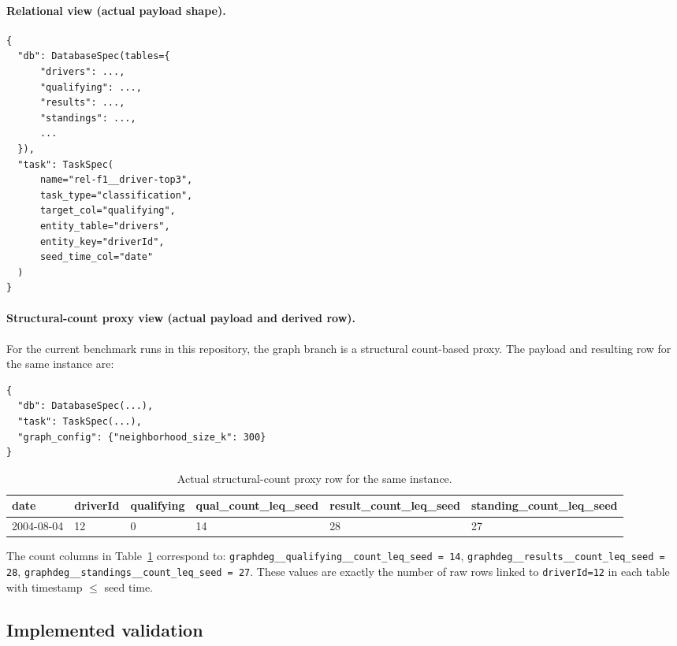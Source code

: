 \documentclass[11pt]{article}
\begin{document}
\paragraph{Relational view (actual payload shape).}
\begin{lstlisting}
{
  "db": DatabaseSpec(tables={
      "drivers": ...,
      "qualifying": ...,
      "results": ...,
      "standings": ...,
      ...
  }),
  "task": TaskSpec(
      name="rel-f1__driver-top3",
      task_type="classification",
      target_col="qualifying",
      entity_table="drivers",
      entity_key="driverId",
      seed_time_col="date"
  )
}
\end{lstlisting}

\paragraph{Structural-count proxy view (actual payload and derived row).}
For the current benchmark runs in this repository, the graph branch is a
structural count-based proxy. The payload and resulting row for the same
instance are:
\begin{lstlisting}
{
  "db": DatabaseSpec(...),
  "task": TaskSpec(...),
  "graph_config": {"neighborhood_size_k": 300}
}
\end{lstlisting}

\begin{table}[h]
\centering
\small
\caption{Actual structural-count proxy row for the same instance.}
\label{tab:graphified_actual_example}
\begin{tabular}{llllll}
\toprule
date & driverId & qualifying & qual\_count\_leq\_seed & result\_count\_leq\_seed & standing\_count\_leq\_seed \\
\midrule
2004-08-04 & 12 & 0 & 14 & 28 & 27 \\
\bottomrule
\end{tabular}
\end{table}

The count columns in Table~\ref{tab:graphified_actual_example} correspond to:
\texttt{graphdeg\_\_qualifying\_\_count\_leq\_seed = 14},
\texttt{graphdeg\_\_results\_\_count\_leq\_seed = 28},
\texttt{graphdeg\_\_standings\_\_count\_leq\_seed = 27}.
These values are exactly the number of raw rows linked to
\texttt{driverId=12} in each table with timestamp \(\le\) seed time.

\subsection{Implemented validation}
\end{document}
